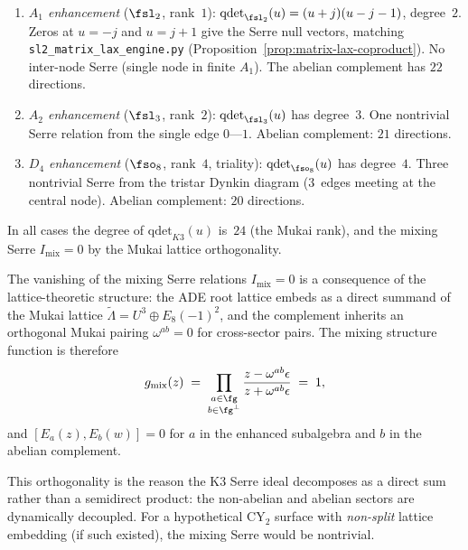 \begin{remark}
\label{rem:k3-serre-examples}
\begin{enumerate}[label=\textup{(\alph*)}]
\item \emph{$A_1$ enhancement} ($\fsl_2$, rank~$1$):
 $\mathrm{qdet}_{\fsl_2}(u) = (u + j)(u - j - 1)$, degree~$2$.
 Zeros at $u = -j$ and $u = j + 1$ give the Serre null vectors,
 matching \texttt{sl2\_matrix\_lax\_engine.py}
 (Proposition~\ref{prop:matrix-lax-coproduct}).
 No inter-node Serre (single node in finite $A_1$).
 The abelian complement has $22$ directions.

\item \emph{$A_2$ enhancement} ($\fsl_3$, rank~$2$):
 $\mathrm{qdet}_{\fsl_3}(u)$ has degree~$3$.
 One nontrivial Serre relation from the single edge $0$---$1$.
 Abelian complement: $21$ directions.

\item \emph{$D_4$ enhancement} ($\fso_8$, rank~$4$, triality):
 $\mathrm{qdet}_{\fso_8}(u)$ has degree~$4$.
 Three nontrivial Serre from the tristar Dynkin diagram
 ($3$~edges meeting at the central node).
 Abelian complement: $20$ directions.
\end{enumerate}
In all cases the degree of $\mathrm{qdet}_{K3}(u)$ is~$24$ (the Mukai rank),
and the mixing Serre $I_{\mathrm{mix}} = 0$ by the Mukai lattice
orthogonality.
\end{remark}

\begin{remark}
\label{rem:k3-serre-mixing-mechanism}
The vanishing of the mixing Serre relations $I_{\mathrm{mix}} = 0$
is a consequence of the lattice-theoretic structure:
the ADE root lattice embeds as a direct summand of the Mukai lattice
$\widetilde{\Lambda} = U^3 \oplus E_8(-1)^2$,
and the complement inherits an orthogonal Mukai pairing
$\omega^{ab} = 0$ for cross-sector pairs.
The mixing structure function is therefore
\[
 g_{\mathrm{mix}}(z) \;=\;
 \prod_{\substack{a \in \fg \\ b \in \fg^\perp}}
 \frac{z - \omega^{ab} \epsilon}{z + \omega^{ab} \epsilon}
 \;=\; 1,
\]
and $[E_a(z), E_b(w)] = 0$ for $a$ in the enhanced subalgebra and
$b$ in the abelian complement.

This orthogonality is the reason the K3 Serre ideal decomposes as
a direct sum rather than a semidirect product: the non-abelian and
abelian sectors are dynamically decoupled.  For a hypothetical
CY$_2$ surface with \emph{non-split} lattice embedding (if such
existed), the mixing Serre would be nontrivial.
\end{remark}

